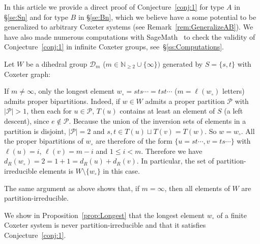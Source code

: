 \documentclass[Unicode]{cedram-alco}
\theoremstyle{definition}
\begin{document}
 In this article we provide a direct proof of Conjecture~\ref{conj:1} for type $A$ in \S\ref{se:Sn} and for type $B$ in \S\ref{se:Bn}, which we believe have a some potential to be generalized to arbitrary Coxeter systems (see Remark~\ref{rem:GeneralizeAB}).  We have also made numerous computations with SageMath~\cite{sage} to check the validity of Conjecture~\ref{conj:1} in infinite Coxeter groups, see~\S\ref{ss:Computations}. 

\begin{ex}\label{ex:1}  Let $W$ be a dihedral group $\mathcal D_m$ ($m\in\mathbb N_{\geq 2}\cup\{\infty\})$ generated by $S=\{s,t\}$ with Coxeter graph:
\begin{center}
\end{center}
If $m\not=\infty$, only the longest element $w_\circ = sts\cdots=tst\cdots$ ($m=\ell(w_\circ)$ letters)  admits proper bipartitions. Indeed, if $w\in W$ admits a proper partition $\mathcal P$ with $|\mathcal P|>1$, then each for $u\in\mathcal P$, $T(u)$ contains at least an element of $S$ (a left descent), since $e\not\in \mathcal P$. Because the union of the inversion sets of elements in a partition is disjoint,   $|\mathcal P|=2$ and $s,t\in T(u)\sqcup T(v)=T(w)$. So $w=w_\circ$.  All the proper bipartitions of $w_\circ$ are therefore of the form $\{u=st\cdots, v=ts\cdots\}$ with $\ell(u)=i$, $\ell(v)=m-i$ and $1\leq i<m$.   Therefore we have $d_R(w_\circ)=2=1+1=d_R(u)+d_R(v)$.
In particular, the set of partition-irreducible elements is $W\setminus\{w_\circ\}$ in this case.

The same argument as above shows that, if $m=\infty$, then all elements of $W$ are partition-irreducible. 
\end{ex}

We show in Proposition~\ref{prop:Longest} that the longest element $w_\circ$ of a finite Coxeter system is never partition-irreducible and that it satisfies Conjecture~\ref{conj:1}. 
\end{document}
